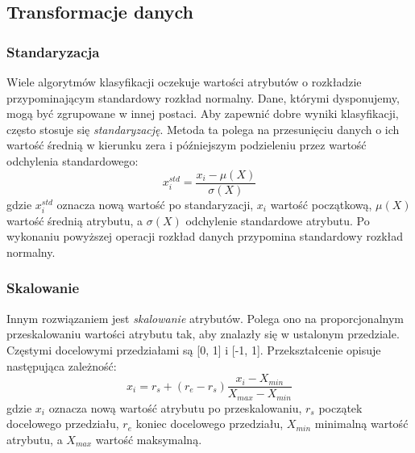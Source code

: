 \documentclass[../thesis.tex]{subfiles}
\begin{document}
\subsection{Transformacje danych}

\subsubsection{Standaryzacja}

Wiele algorytmów klasyfikacji oczekuje wartości atrybutów o rozkładzie przypominającym standardowy rozkład normalny. Dane, którymi dysponujemy, mogą być zgrupowane w innej postaci. Aby zapewnić dobre wyniki klasyfikacji, często stosuje się \emph{standaryzację}. Metoda ta polega na przesunięciu danych o ich wartość średnią w kierunku zera i późniejszym podzieleniu przez wartość odchylenia standardowego:
\[x_i^{std} = \frac{x_i - \mu(X)}{\sigma(X)}\]
gdzie $x_i^{std}$ oznacza nową wartość po standaryzacji, $x_i$ wartość początkową, $\mu(X)$ wartość średnią atrybutu, a $\sigma(X)$ odchylenie standardowe atrybutu. Po wykonaniu powyższej operacji rozkład danych przypomina standardowy rozkład normalny.

\subsubsection{Skalowanie}

Innym rozwiązaniem jest \emph{skalowanie} atrybutów. Polega ono na proporcjonalnym przeskalowaniu wartości atrybutu tak, aby znalazły się w ustalonym przedziale. Częstymi docelowymi przedziałami są [0, 1] i [-1, 1]. Przekształcenie opisuje następująca zależność:
\[x_i = r_s + (r_e - r_s)\frac{x_i - X_{min}}{X_{max} - X_{min}}\]
gdzie $x_i$ oznacza nową wartość atrybutu po przeskalowaniu, $r_s$ początek docelowego przedziału, $r_e$ koniec docelowego przedziału, $X_{min}$ minimalną wartość atrybutu, a $X_{max}$ wartość maksymalną.
\end{document}
